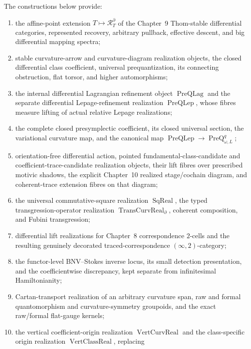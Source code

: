 The constructions below provide:
\begin{enumerate}
\item the affine-point extension $T\mapsto\mathcal R_T^{\partial}$ of the
      Chapter~9 Thom-stable differential categories, represented recovery,
      arbitrary pullback, effective descent, and big differential mapping spectra;
\item stable curvature-arrow and curvature-diagram realization objects, the closed
      differential class coefficient, universal prequantization, its connecting
      obstruction, flat torsor, and higher automorphisms;
\item the internal differential Lagrangian refinement object
      $\operatorname{PreQLag}$ and the separate differential Lepage-refinement
      realization $\operatorname{PreQLep}$, whose fibres measure lifting of actual
      relative Lepage realizations;
\item the complete closed presymplectic coefficient, its closed universal section,
      the variational curvature map, and the canonical map
      $\operatorname{PreQLep}\to\operatorname{PreQ}_{\omega,L}^{q}$;
\item orientation-free differential action, pointed fundamental-class-candidate
      and coefficient-trace-candidate realization objects, their lift fibres over
      prescribed motivic shadows, the explicit Chapter~10 realized stage/cochain
      diagram, and coherent-trace extension fibres on that diagram;
\item the universal commutative-square realization $\operatorname{SqReal}$,
      the typed transgression-operator realization
      $\operatorname{TransCurvReal}_{\partial}$, coherent composition, and
      Fubini transgression;
\item differential lift realizations for Chapter~8 correspondence $2$-cells and the
      resulting genuinely decorated traced-correspondence $(\infty,2)$-category;
\item the functor-level BNV--Stokes inverse locus, its small detection
      presentation, and the coefficientwise discrepancy, kept separate from
      infinitesimal Hamiltonianity;
\item Cartan-transport realization of an arbitrary curvature span, raw and formal
      quantomorphism and curvature-symmetry groupoids, and the exact raw/formal
      flat-gauge kernels;
\item the vertical coefficient-origin realization $\operatorname{VertCurvReal}$ and
      the class-specific origin realization $\operatorname{VertClassReal}$, replacing

\end{enumerate}
